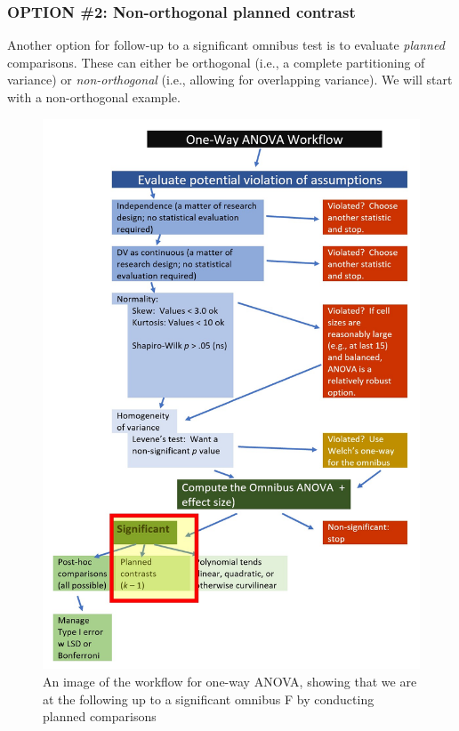 \documentclass[
  11pt,
]{book}
\begin{document}
\hypertarget{option-2-non-orthogonal-planned-contrast}{%
\subsubsection{OPTION \#2: Non-orthogonal planned contrast}\label{option-2-non-orthogonal-planned-contrast}}

Another option for follow-up to a significant omnibus test is to evaluate \emph{planned} comparisons. These can either be orthogonal (i.e., a complete partitioning of variance) or \emph{non-orthogonal} (i.e., allowing for overlapping variance). We will start with a non-orthogonal example.

\begin{figure}
\centering
\includegraphics{images/oneway/OnewayWrkFlw_planned.jpg}
\caption{An image of the workflow for one-way ANOVA, showing that we are at the following up to a significant omnibus F by conducting planned comparisons}
\end{figure}
\end{document}
